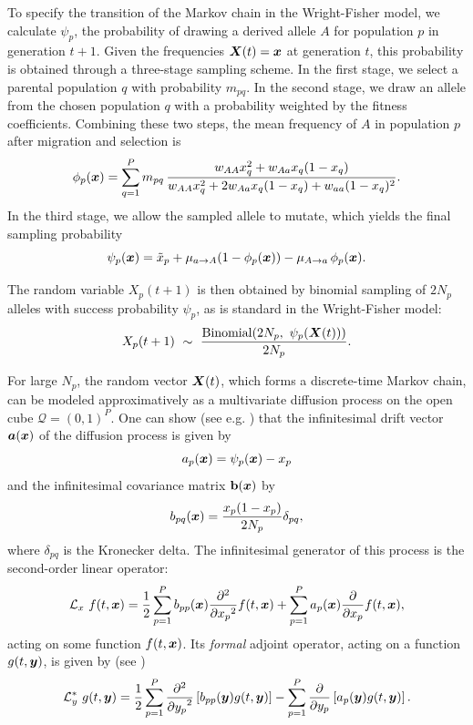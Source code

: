 \documentclass{article}
\def\x{\mbox{\boldmath $x$}}
\def\y{\mbox{\boldmath $y$}}
\def\a{\mbox{\boldmath $a$}}
\def\X{\mbox{\boldmath $X$}}
\def\calL{{\mathcal L}}
\def\calQ{{\mathcal Q}}
\begin{document}
To specify the transition of the Markov chain in the Wright-Fisher model, we calculate $\psi_p$, the probability of drawing a derived allele $A$ for population $p$ in generation $t+1$.
Given the frequencies $\X(t) = \x$ at generation $t$, this probability is obtained through a three-stage sampling scheme.
In the first stage, we select a parental population $q$ with probability $m_{pq}$.
In the second stage, we draw an allele from the chosen population $q$ with a probability weighted by the fitness coefficients.
Combining these two steps, the mean frequency of $A$ in population $p$ after migration and selection is
\begin{equation}\label{eq:WF}
\phi_p(\x) = \sum_{q=1}^P m_{pq} \, \frac{w_{AA}x_q^2 + w_{Aa}x_q(1-x_q)}{w_{AA}x_q^2 + 2w_{Aa}x_q(1-x_q) + w_{aa}(1-x_q)^2}.
\end{equation}
In the third stage, we allow the sampled allele to mutate, which yields the final sampling probability
\begin{equation}\label{eq:mutation}
\psi_p(\x) = \tilde{x}_p + \mu_{a \to A}(1 - \phi_p(\x)) - \mu_{A \to a}\,\phi_p(\x).
\end{equation}

The random variable $X_p(t+1)$ is then obtained by binomial sampling of $2N_p$ alleles with success probability $\psi_p$, as is standard in the Wright-Fisher model:
\begin{equation}\label{eq:sampling}
X_p(t+1) \ \sim\ \frac{\mathrm{Binomial}\!\left(2N_p,\ \psi_p(\X(t))\right)}{2N_p}.
\end{equation}

\bigskip

For large $N_p$, the random vector $\X(t)$, which forms a discrete-time Markov chain, can be modeled approximatively as a multivariate diffusion process on the open cube $\calQ=(0,1)^P$.
One can show (see e.g. \citet[ch. 15.2]{karlin1981}) that the infinitesimal drift vector $\a(\x)$ of the diffusion process is given by
\begin{equation}
\label{eq:mean_func}
a_p(\x) = \psi_p(\x)-x_p
\end{equation}
and the infinitesimal covariance matrix $\mathbf{b}(\x)$ by
\begin{equation}
\label{eq:cov_func}
b_{pq}(\x) = \frac{x_p(1-x_p)}{2N_p}\delta_{pq},
\end{equation}
where $\delta_{pq}$ is the Kronecker delta. The infinitesimal generator of this process is the second-order linear operator:
\begin{equation}\label{eq:generator}
\calL_x \ f(t,\x) = \frac{1}{2}\sum_{p=1}^P b_{pp}(\x) \frac{\partial^2}{\partial {x_p}^2} f(t,\x) + \sum_{p=1}^P a_p(\x) \frac{\partial}{\partial x_p} f(t,\x),
\end{equation}
acting on some function $f(t,\x)$.
Its \textit{formal} adjoint operator, acting on a function $g(t,\y)$, is given by (see \citet[ch. 15.5]{karlin1981})
\begin{equation*}
\calL_y^* \ g(t,\y) = \frac{1}{2}\sum_{p=1}^P \frac{\partial^2}{{\partial y_p}^2} \left[b_{pp}(\y)g(t,\y)\right] - \sum_{p=1}^P \frac{\partial}{\partial y_p} \left[a_p(\y) g(t,\y)\right].
\end{equation*}
\end{document}
